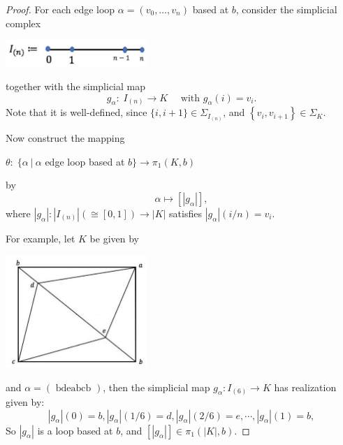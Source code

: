 \begin{proof} For each edge loop \(\alpha  = \left( {{v}_{0},\ldots,{v}_{n}}\right)\) based at \(b\), consider the simplicial complex
\begin{center}
\includegraphics[width=0.4\textwidth]{images/Ch8_n_segments.jpg}
\end{center}
together with the simplicial map
\[
{g}_{\alpha }: \;{I}_{\left( n\right) } \rightarrow  K
\quad \text{ with }{g}_{\alpha }\left( i\right)  = {v}_{i}.
\]
Note that it is well-defined, since \(\{ i,i + 1\}  \in  \Sigma_{{I}_{\left( n\right) }}\), and \(\left\{  {{v}_{i},{v}_{i + 1}}\right\}   \in  \Sigma_{K}\).

Now construct the mapping
\begin{center}
\(\theta : \;\{ \alpha\ |\ \alpha \) edge loop based at \(b\}  \rightarrow  {\pi }_{1}\left( {K,b}\right)\)
\end{center}
by 
\[\alpha  \mapsto  \left\lbrack  \left| {g}_{\alpha }\right| \right\rbrack,\]
where \(\left| {g}_{\alpha }\right| : \left| {I}_{\left( n\right) }\right| \left( { \cong  \left\lbrack  {0,1}\right\rbrack  }\right)  \rightarrow  \left| K\right|\)
satisfies
\(\left| {g}_{\alpha }\right| \left( {i/n}\right)  = {v}_{i}\).

For example, let $K$ be given by
\begin{center}
\includegraphics[width=0.4\textwidth]{images/Ch8_edge_loop.jpg}
\end{center}
and $\alpha  = \left( \text{ bdeabcb }\right)$, then the simplicial map $g_{\alpha}: I_{(6)} \to K$
has realization given by:
\[
\left| {g}_{\alpha }\right| \left( 0\right)  = b,\left| {g}_{\alpha }\right| \left( {1/6}\right)  = d,\left| {g}_{\alpha }\right| \left( {2/6}\right)  = e,\cdots,\left| {g}_{\alpha }\right| \left( 1\right)  = b,
\]
So \(\left| {g}_{\alpha }\right|\) is a loop based at \(b\), and \(\left\lbrack  \left| {g}_{\alpha }\right| \right\rbrack   \in  {\pi }_{1}\left( {\left| K\right|,b}\right)\).


\end{proof}
